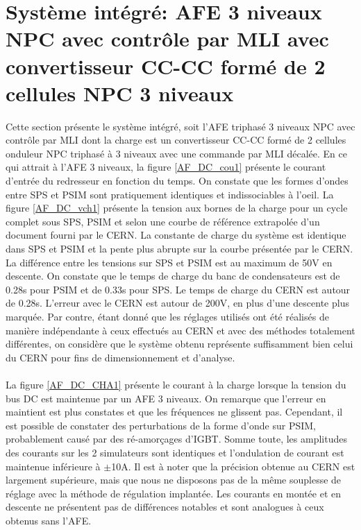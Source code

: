 \section{Système intégré: AFE 3 niveaux NPC avec contrôle par MLI avec convertisseur CC-CC formé de 2 cellules NPC 3 niveaux}
Cette section présente le système intégré, soit l'AFE triphasé 3 niveaux NPC avec contrôle par MLI dont la charge est un convertisseur CC-CC formé de 2 cellules onduleur NPC triphasé à 3 niveaux avec une commande par MLI décalée. En ce qui attrait à l'AFE 3 niveaux, la figure \ref{AF_DC_cou1} présente le courant d'entrée du redresseur en fonction du temps. On constate que les formes d'ondes entre SPS et PSIM sont pratiquement identiques et indissociables à l'oeil. La figure \ref{AF_DC_vch1} présente la tension aux bornes de la charge pour un cycle complet sous SPS, PSIM  et selon une courbe de référence extrapolée d'un document fourni par le CERN. La constante de charge du système est identique dans SPS et PSIM et la pente plus abrupte sur la courbe présentée par le CERN. La différence entre les tensions sur SPS et PSIM est au maximum de 50V en descente. On constate que le temps de charge du banc de condensateurs est de 0.28s pour PSIM et de 0.33s pour SPS. Le temps de charge du CERN est autour de 0.28s. L'erreur avec le CERN est autour de 200V, en plus d'une descente plus marquée. Par contre, étant donné que les réglages utilisés ont été réalisés de manière indépendante à ceux effectués au CERN et avec des méthodes totalement différentes, on considère que le système obtenu représente suffisamment bien celui du CERN pour fins de dimensionnement et d'analyse.

\paragraph{}La figure \ref{AF_DC_CHA1} présente le courant à la charge lorsque la tension du bus DC est maintenue par un AFE 3 niveaux. On remarque que l'erreur en maintient est plus constates et que les fréquences ne glissent pas. Cependant, il est possible de constater des perturbations de la forme d'onde sur PSIM, probablement causé par des ré-amorçages d'IGBT. Somme toute, les amplitudes des courants sur les 2 simulateurs sont identiques et l'ondulation  de courant est maintenue inférieure à $\pm$10A. Il est à noter que la précision obtenue au CERN est largement supérieure, mais que nous ne disposons pas de la même souplesse de réglage avec la méthode de régulation implantée. Les courants en montée  et en descente ne présentent pas de différences notables et sont analogues à ceux obtenus sans l'AFE.

